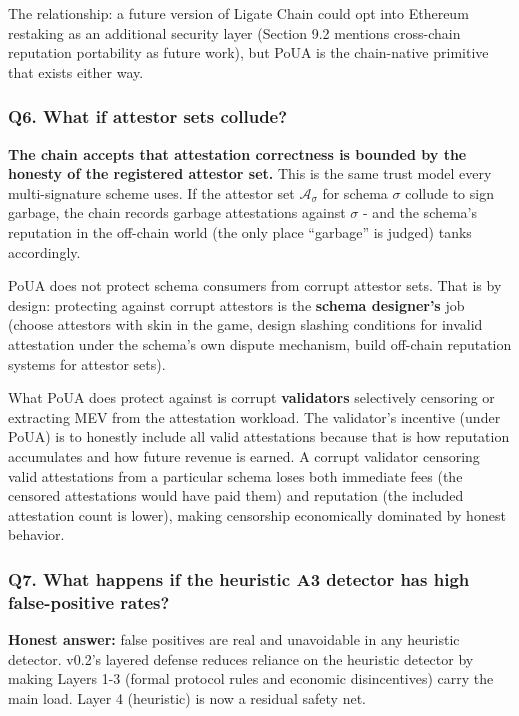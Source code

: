 \documentclass[
  11pt,
]{article}
\begin{document}
The relationship: a future version of Ligate Chain could opt into
Ethereum restaking as an additional security layer (Section 9.2 mentions
cross-chain reputation portability as future work), but PoUA is the
chain-native primitive that exists either way.

\subsubsection{Q6. What if attestor sets
collude?}\label{q6.-what-if-attestor-sets-collude}

\textbf{The chain accepts that attestation correctness is bounded by the
honesty of the registered attestor set.} This is the same trust model
every multi-signature scheme uses. If the attestor set
\(\mathcal{A}_\sigma\) for schema \(\sigma\) collude to sign garbage,
the chain records garbage attestations against \(\sigma\) - and the
schema's reputation in the off-chain world (the only place ``garbage''
is judged) tanks accordingly.

PoUA does not protect schema consumers from corrupt attestor sets. That
is by design: protecting against corrupt attestors is the \textbf{schema
designer's} job (choose attestors with skin in the game, design slashing
conditions for invalid attestation under the schema's own dispute
mechanism, build off-chain reputation systems for attestor sets).

What PoUA does protect against is corrupt \textbf{validators}
selectively censoring or extracting MEV from the attestation workload.
The validator's incentive (under PoUA) is to honestly include all valid
attestations because that is how reputation accumulates and how future
revenue is earned. A corrupt validator censoring valid attestations from
a particular schema loses both immediate fees (the censored attestations
would have paid them) and reputation (the included attestation count is
lower), making censorship economically dominated by honest behavior.

\subsubsection{Q7. What happens if the heuristic A3 detector has high
false-positive
rates?}\label{q7.-what-happens-if-the-heuristic-a3-detector-has-high-false-positive-rates}

\textbf{Honest answer:} false positives are real and unavoidable in any
heuristic detector. v0.2's layered defense reduces reliance on the
heuristic detector by making Layers 1-3 (formal protocol rules and
economic disincentives) carry the main load. Layer 4 (heuristic) is now
a residual safety net.
\end{document}
